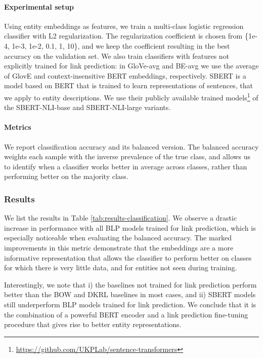 \documentclass[sigconf]{acmart}
\begin{document}
\paragraph{Experimental setup} Using entity embeddings as features, we train a multi-class logistic regression classifier with L2 regularization. The regularization coefficient is chosen from \{1e-4, 1e-3, 1e-2, 0.1, 1, 10\}, and we keep the coefficient resulting in the best accuracy on the validation set. We also train classifiers with features not explicitly trained for link prediction: in GloVe-avg and BE-avg we use the average of GlovE and context-insensitive BERT embeddings, respectively. SBERT \citep{reimers2019sentence} is a model based on BERT that is trained to learn representations of sentences, that we apply to entity descriptions. We use their publicly available trained models\footnote{\url{https://github.com/UKPLab/sentence-transformers}} of the SBERT-NLI-base and SBERT-NLI-large variants.

\paragraph{Metrics} We report classification accuracy and its balanced version. The balanced accuracy weights each sample with the inverse prevalence of the true class, and allows us to identify when a classifier works better in average across classes, rather than performing better on the majority class.

\subsubsection{Results} We list the results in Table \ref{tab:results-classification}. We observe a drastic increase in performance with all BLP models trained for link prediction, which is especially noticeable when evaluating the balanced accuracy. The marked improvements in this metric demonstrate that the embeddings are a more informative representation that allows the classifier to perform better on classes for which there is very little data, and for entities not seen during training.

Interestingly, we note that i) the baselines not trained for link prediction perform better than the BOW and DKRL baselines in most cases, and ii) SBERT models still underperform BLP models trained for link prediction. We conclude that it is the combination of a powerful BERT encoder and a link prediction fine-tuning procedure that gives rise to better entity representations.
\end{document}
